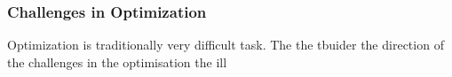 \subsubsection{Challenges in Optimization}

Optimization is traditionally very difficult task. The the tbuider the direction of the challenges in the optimisation 
the ill 
